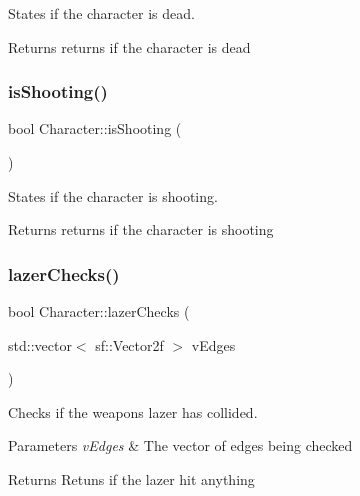 States if the character is dead. 

\begin{DoxyReturn}{Returns}
returns if the character is dead 
\end{DoxyReturn}
\mbox{\label{class_character_ad0f38e40696e54180a5cd49622480afb}} 
\subsubsection{\texorpdfstring{is\+Shooting()}{isShooting()}}
{\footnotesize\ttfamily bool Character\+::is\+Shooting (\begin{DoxyParamCaption}{ }\end{DoxyParamCaption})}



States if the character is shooting. 

\begin{DoxyReturn}{Returns}
returns if the character is shooting 
\end{DoxyReturn}
\mbox{\label{class_character_ac40a807deb125f3c6da03ffeebe157f4}} 
\subsubsection{\texorpdfstring{lazer\+Checks()}{lazerChecks()}}
{\footnotesize\ttfamily bool Character\+::lazer\+Checks (\begin{DoxyParamCaption}\item[{std\+::vector$<$ sf\+::\+Vector2f $>$}]{v\+Edges }\end{DoxyParamCaption})}



Checks if the weapons lazer has collided. 


\begin{DoxyParams}{Parameters}
{\em v\+Edges} & The vector of edges being checked \\
\hline
\end{DoxyParams}
\begin{DoxyReturn}{Returns}
Retuns if the lazer hit anything 
\end{DoxyReturn}
\mbox{\label{class_character_a141b0f98a619a88017eba5675268f3ab}} 

